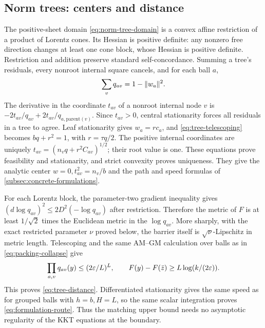 \subsection{Norm trees: centers and distance}
The positive-sheet domain \eqref{eq:norm-tree-domain} is a convex affine
restriction of a product of Lorentz cones. Its Hessian is positive
definite: any nonzero free direction changes at least one cone block,
whose Hessian is positive definite. Restriction and addition preserve
standard self-concordance. Summing a tree's residuals, every nonroot
internal square cancels, and for each ball $a$,
\begin{equation}
 \sum_vq_{av}=1-\lVert w_a\rVert^2.
 \label{eq:tree-telescoping}
\end{equation}
The derivative in the coordinate $t_{av}$ of a nonroot internal node
$v$ is
$-2t_{av}/q_{av}+2t_{av}/q_{a,\mathrm{parent}(v)}$.
Since $t_{av}>0$, central stationarity forces all residuals in a tree
to agree. Leaf stationarity gives $w_a=rc_a$, and
\eqref{eq:tree-telescoping} becomes $bq+r^2=1$, with $r=\tau q/2$.
The positive internal coordinates are uniquely
$t_{av}=(n_vq+r^2C_{av})^{1/2}$; their root value is one.
These equations prove feasibility and stationarity, and strict convexity
proves uniqueness. They give the analytic center $w=0,t_{av}^2=n_v/b$
and the path and speed formulas of
\cref{subsec:concrete-formulations}.

For each Lorentz block, the parameter-two gradient inequality gives $(d\log q_{av})^2\leq2D^2(-\log q_{av})$ after
restriction. Therefore the metric of $F$ is at least $1/\sqrt2$ times
the Euclidean metric in the $\log q_{av}$. More sharply, with the exact restricted
parameter $\nu$ proved below, the barrier itself is
$\sqrt\nu$-Lipschitz in metric length. Telescoping and the
same AM--GM calculation over balls as in \eqref{eq:packing-collapse}
give
\[
 \prod_{a,v}q_{av}(y)\leq(2\varepsilon/L)^L,\qquad
 F(y)-F(\bar z)\geq L\log(k/(2\varepsilon)).
\]
This proves \eqref{eq:tree-distance}. Differentiated stationarity gives
the same speed as for grouped balls with $h=b,H=L$, so the same scalar
integration proves \eqref{eq:formulation-route}. Thus the matching
upper bound needs no asymptotic regularity of the KKT equations at the
boundary.

